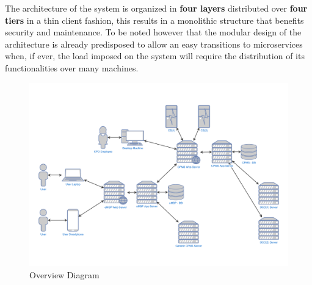 \documentclass[11pt]{article}
\begin{document}
The architecture of the system is organized in \textbf{four layers} distributed over \textbf{four tiers} in a thin client fashion, this results in a monolithic structure that benefits security and maintenance. To be noted however that the modular design of the architecture is already predisposed to allow an easy transitions to microservices when, if ever, the load imposed on the system will require the distribution of its functionalities over many machines. \\

\begin{figure}[!ht]
    \centering
    \includegraphics[page={1}, trim=1cm 1.25cm 1cm 1.25cm, width=\linewidth, clip]{OverviewDiagram.pdf}
    \caption{Overview Diagram}
\end{figure}
\end{document}
